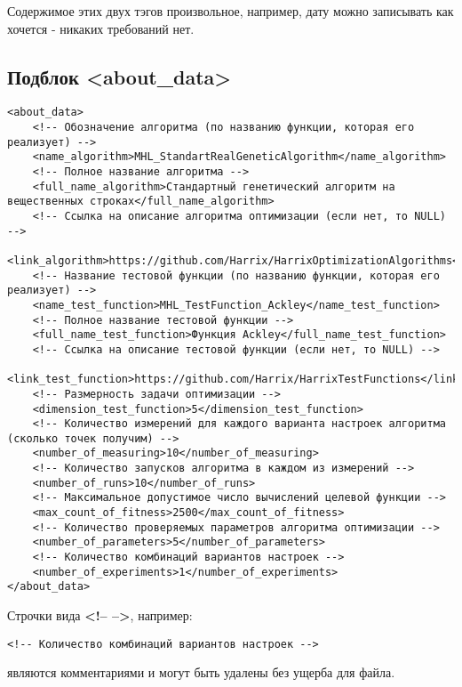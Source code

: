 \documentclass[a4paper,12pt]{article}
\begin{document}
Содержимое этих двух тэгов произвольное, например, дату можно записывать как хочется - никаких требований нет.

\subsection{Подблок <about\_data>}

\begin{lstlisting}[label=Part05,caption=Подблок в файле Harrix Optimization Testing]
<about_data>
	<!-- Обозначение алгоритма (по названию функции, которая его реализует) -->
	<name_algorithm>MHL_StandartRealGeneticAlgorithm</name_algorithm>
	<!-- Полное название алгоритма -->
	<full_name_algorithm>Стандартный генетический алгоритм на вещественных строках</full_name_algorithm>
	<!-- Ссылка на описание алгоритма оптимизации (если нет, то NULL) -->
	<link_algorithm>https://github.com/Harrix/HarrixOptimizationAlgorithms</link_algorithm>
	<!-- Название тестовой функции (по названию функции, которая его реализует) -->
	<name_test_function>MHL_TestFunction_Ackley</name_test_function>
	<!-- Полное название тестовой функции -->
	<full_name_test_function>Функция Ackley</full_name_test_function>
	<!-- Ссылка на описание тестовой функции (если нет, то NULL) -->
	<link_test_function>https://github.com/Harrix/HarrixTestFunctions</link_test_function>
	<!-- Размерность задачи оптимизации -->
	<dimension_test_function>5</dimension_test_function>
	<!-- Количество измерений для каждого варианта настроек алгоритма (сколько точек получим) -->
	<number_of_measuring>10</number_of_measuring>
	<!-- Количество запусков алгоритма в каждом из измерений -->
	<number_of_runs>10</number_of_runs>
	<!-- Максимальное допустимое число вычислений целевой функции -->
	<max_count_of_fitness>2500</max_count_of_fitness>
	<!-- Количество проверяемых параметров алгоритма оптимизации -->
	<number_of_parameters>5</number_of_parameters>
	<!-- Количество комбинаций вариантов настроек -->
	<number_of_experiments>1</number_of_experiments>
</about_data>
\end{lstlisting}

Строчки вида \textbf{<!--  -->}, например:

\begin{lstlisting}[label=Part06,caption=Комментарий в файле Harrix Optimization Testing]
<!-- Количество комбинаций вариантов настроек -->
\end{lstlisting}

являются комментариями и могут быть удалены без ущерба для файла.
\end{document}
